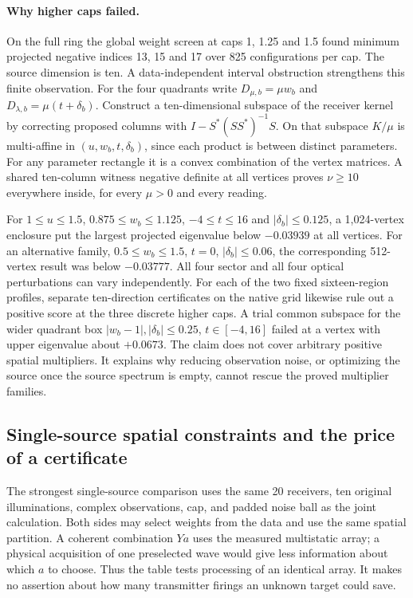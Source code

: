 \documentclass[anonymous,12pt]{iopjournal}
\theoremstyle{remark}\newtheorem{remark}[theorem]{Remark}
\numberwithin{equation}{section}
\begin{document}
\paragraph{Why higher caps failed.}
On the full ring the global weight screen at caps 1, 1.25 and 1.5 found minimum projected negative indices 13, 15 and 17 over 825 configurations per cap. The source dimension is ten. A data-independent interval obstruction strengthens this finite observation. For the four quadrants write $D_{\mu,b}=\mu w_b$ and $D_{\lambda,b}=\mu(t+\delta_b)$. Construct a ten-dimensional subspace of the receiver kernel by correcting proposed columns with $I-S^*(SS^*)^{-1}S$. On that subspace $K/\mu$ is multi-affine in $(u,w_b,t,\delta_b)$, since each product is between distinct parameters. For any parameter rectangle it is a convex combination of the vertex matrices. A shared ten-column witness negative definite at all vertices proves $\nu\ge10$ everywhere inside, for every $\mu>0$ and every reading.

For $1\le u\le1.5$, $0.875\le w_b\le1.125$, $-4\le t\le16$ and $|\delta_b|\le0.125$, a 1,024-vertex enclosure put the largest projected eigenvalue below $-0.03939$ at all vertices. For an alternative family, $0.5\le w_b\le1.5$, $t=0$, $|\delta_b|\le0.06$, the corresponding 512-vertex result was below $-0.03777$. All four sector and all four optical perturbations can vary independently. For each of the two fixed sixteen-region profiles, separate ten-direction certificates on the native grid likewise rule out a positive score at the three discrete higher caps. A trial common subspace for the wider quadrant box $|w_b-1|,|\delta_b|\le0.25$, $t\in[-4,16]$ failed at a vertex with upper eigenvalue about $+0.0673$. The claim does not cover arbitrary positive spatial multipliers. It explains why reducing observation noise, or optimizing the source once the source spectrum is empty, cannot rescue the proved multiplier families.

\subsection{Single-source spatial constraints and the price of a certificate}
The strongest single-source comparison uses the same 20 receivers, ten original illuminations, complex observations, cap, and padded noise ball as the joint calculation. Both sides may select weights from the data and use the same spatial partition. A coherent combination $Ya$ uses the measured multistatic array; a physical acquisition of one preselected wave would give less information about which $a$ to choose. Thus the table tests processing of an identical array. It makes no assertion about how many transmitter firings an unknown target could save.
\end{document}
